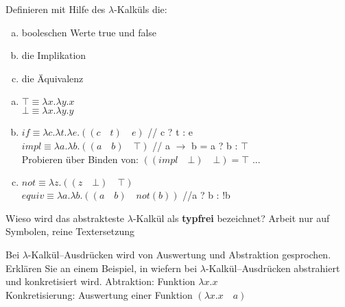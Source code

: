 \begin{card}
	Definieren mit Hilfe des $\lambda$-Kalküls die:
	\begin{enumerate}[a)]
    \item booleschen Werte true und false
    \item die Implikation
    \item die Äquivalenz
	\end{enumerate}
	\hr
	\begin{enumerate}[a)]
    \item $\top \equiv \lambda x.\lambda y . x$\\
        $\bot \equiv \lambda x.\lambda y . y$
    \item $if \equiv \lambda c.\lambda t.\lambda e.((c \quad t) \quad e)$ // c ? t : e\\
        $impl \equiv \lambda a.\lambda b.((a \quad b) \quad \top)$ // a $\rightarrow$ b = a ? b : $\top$\\
        Probieren über Binden von: $((impl \quad \bot) \quad \bot) = \top$ ...
    \item	$not \equiv \lambda z.((z \quad \bot) \quad \top)$\\
        $equiv \equiv  \lambda a.\lambda b.((a \quad b) \quad not(b))$ //a ? b : !b
	\end{enumerate}
\end{card}

\begin{card}
	Wieso wird das abstrakteste $\lambda$-Kalkül als \textbf{typfrei} bezeichnet?
	\hr
	Arbeit nur auf Symbolen, reine Textersetzung
\end{card}

\begin{card}
  Bei $\lambda$-Kalkül--Ausdrücken wird von Auswertung und Abstraktion gesprochen. Erklären Sie an einem Beispiel, in wiefern bei $\lambda$-Kalkül--Ausdrücken abstrahiert und konkretisiert wird.
  \hr
  Abtraktion: Funktion $\lambda x.x$\\
  Konkretisierung: Auswertung einer Funktion $(\lambda x.x \quad a)$
\end{card}


